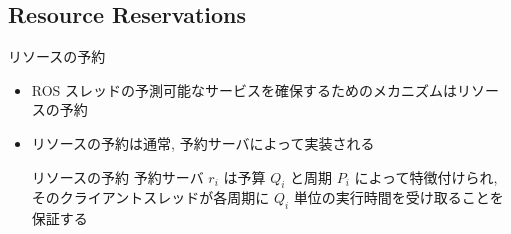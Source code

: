 


\subsection{Resource Reservations}
\label{ssec: resource reservations}

\begin{frame}{リソースの予約}
    \begin{itemize}
        \item ROS スレッドの予測可能なサービスを確保するためのメカニズムはリソースの予約
        \item リソースの予約は通常, 予約サーバによって実装される
        \begin{block}{リソースの予約}
            予約サーバ $r_{i}$ は予算 $Q_{i}$ と周期 $P_{i}$ によって特徴付けられ, そのクライアントスレッドが各周期に $Q_{i}$ 単位の実行時間を受け取ることを保証する
        \end{block}
    \end{itemize}
\end{frame}

